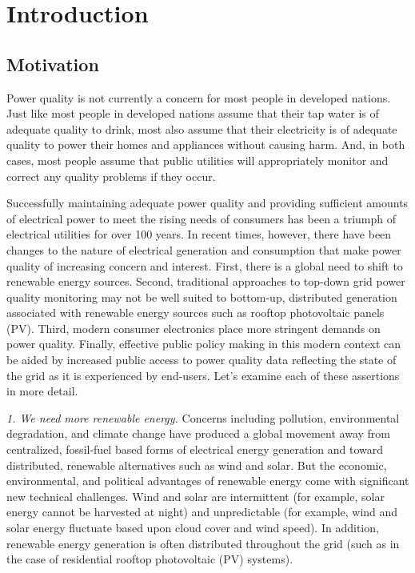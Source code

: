 \section{Introduction}


\subsection{Motivation}

Power quality is not currently a concern for most people in developed nations. Just like most people in developed nations assume that their tap water is of adequate quality to drink, most also assume that their electricity is of adequate quality to power their homes and appliances without causing harm. And, in both cases, most people assume that public utilities will appropriately monitor and correct any quality problems if they occur.

Successfully maintaining adequate power quality and providing sufficient amounts of electrical power to meet the rising needs of consumers has been a triumph of electrical utilities for over 100 years. In recent times, however, there have been changes to the nature of electrical generation and consumption that make power quality of increasing concern and interest. First, there is a global need to shift to renewable energy sources. Second, traditional approaches to top-down grid power quality monitoring may not be well suited to bottom-up, distributed generation associated with renewable energy sources such as rooftop photovoltaic panels (PV). Third, modern consumer electronics place more stringent demands on power quality.  Finally, effective public policy making in this modern context can be aided by increased public access to power quality data reflecting the state of the grid as it is experienced by end-users.  Let's examine each of these assertions in more detail.

{\em 1. We need more renewable energy.} Concerns including pollution, environmental degradation, and climate change have produced a global movement away from centralized, fossil-fuel based forms of electrical energy generation and toward distributed, renewable alternatives such as wind and solar. But the economic, environmental, and political advantages of renewable energy come with significant new technical challenges. Wind and solar are intermittent (for example, solar energy cannot be harvested at night) and unpredictable (for example, wind and solar energy fluctuate based upon cloud cover and wind speed). In addition, renewable energy generation is often distributed throughout the grid (such as in the case of residential rooftop photovoltaic (PV) systems).

